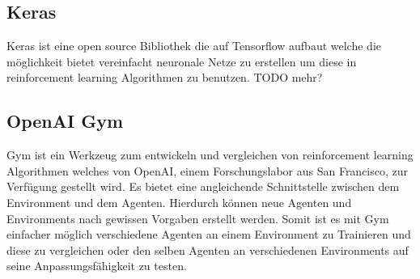 \subsection{Keras}
Keras ist eine open source Bibliothek die auf Tensorflow aufbaut welche die möglichkeit bietet vereinfacht neuronale Netze zu erstellen um diese in reinforcement learning Algorithmen zu benutzen.
\colorbox{red!30}{TODO mehr?}

\subsection{OpenAI Gym}
Gym ist ein Werkzeug zum entwickeln und vergleichen von reinforcement learning Algorithmen welches von OpenAI, einem Forschungslabor aus San Francisco, zur Verfügung gestellt wird. Es bietet eine  \colorbox{red!30}{angleichende  Schnittstelle} zwischen dem Environment und dem Agenten. Hierdurch können neue Agenten und Environments nach gewissen Vorgaben erstellt werden. Somit ist es mit Gym einfacher möglich verschiedene Agenten an einem Environment zu Trainieren und diese zu vergleichen oder den selben Agenten an verschiedenen Environments auf seine Anpassungsfähigkeit zu testen.

